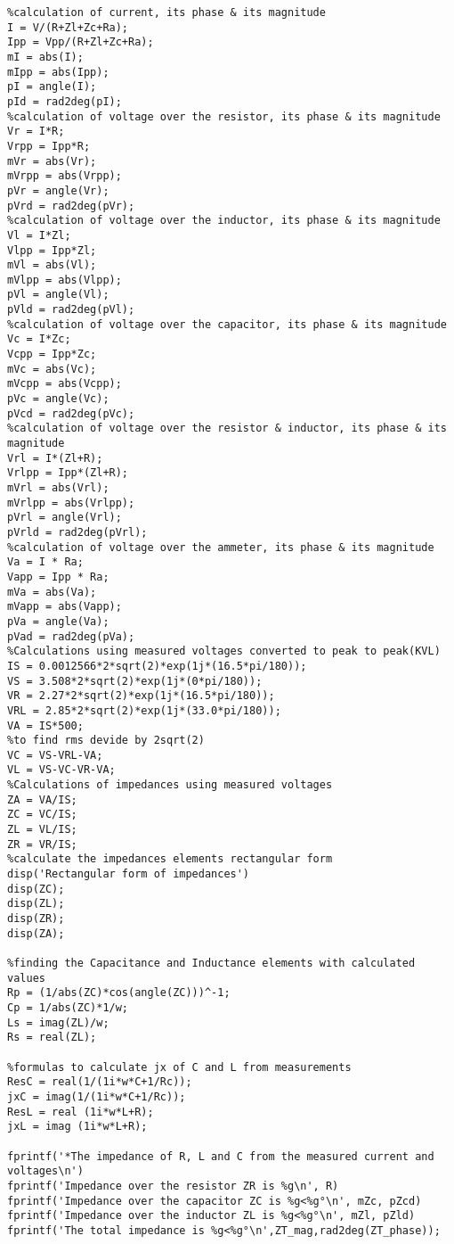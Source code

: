 \documentclass[12pt]{report}
\begin{document}
\begin{verbatim}
%calculation of current, its phase & its magnitude
I = V/(R+Zl+Zc+Ra);              
Ipp = Vpp/(R+Zl+Zc+Ra);
mI = abs(I);
mIpp = abs(Ipp);
pI = angle(I);
pId = rad2deg(pI);
%calculation of voltage over the resistor, its phase & its magnitude
Vr = I*R;             
Vrpp = Ipp*R;
mVr = abs(Vr);
mVrpp = abs(Vrpp);
pVr = angle(Vr);
pVrd = rad2deg(pVr);
%calculation of voltage over the inductor, its phase & its magnitude
Vl = I*Zl;     
Vlpp = Ipp*Zl;
mVl = abs(Vl);
mVlpp = abs(Vlpp);
pVl = angle(Vl);
pVld = rad2deg(pVl);
%calculation of voltage over the capacitor, its phase & its magnitude
Vc = I*Zc;
Vcpp = Ipp*Zc;
mVc = abs(Vc);
mVcpp = abs(Vcpp);
pVc = angle(Vc);
pVcd = rad2deg(pVc);
%calculation of voltage over the resistor & inductor, its phase & its magnitude
Vrl = I*(Zl+R);
Vrlpp = Ipp*(Zl+R);
mVrl = abs(Vrl);
mVrlpp = abs(Vrlpp);
pVrl = angle(Vrl);
pVrld = rad2deg(pVrl);
%calculation of voltage over the ammeter, its phase & its magnitude
Va = I * Ra;
Vapp = Ipp * Ra;
mVa = abs(Va);
mVapp = abs(Vapp);
pVa = angle(Va);
pVad = rad2deg(pVa);
%Calculations using measured voltages converted to peak to peak(KVL)
IS = 0.0012566*2*sqrt(2)*exp(1j*(16.5*pi/180));
VS = 3.508*2*sqrt(2)*exp(1j*(0*pi/180));
VR = 2.27*2*sqrt(2)*exp(1j*(16.5*pi/180));
VRL = 2.85*2*sqrt(2)*exp(1j*(33.0*pi/180));
VA = IS*500;
%to find rms devide by 2sqrt(2)
VC = VS-VRL-VA;
VL = VS-VC-VR-VA;
%Calculations of impedances using measured voltages
ZA = VA/IS;
ZC = VC/IS;
ZL = VL/IS;
ZR = VR/IS;
%calculate the impedances elements rectangular form 
disp('Rectangular form of impedances')
disp(ZC);
disp(ZL);
disp(ZR);
disp(ZA);

%finding the Capacitance and Inductance elements with calculated values
Rp = (1/abs(ZC)*cos(angle(ZC)))^-1;
Cp = 1/abs(ZC)*1/w;
Ls = imag(ZL)/w;
Rs = real(ZL);

%formulas to calculate jx of C and L from measurements
ResC = real(1/(1i*w*C+1/Rc));
jxC = imag(1/(1i*w*C+1/Rc));
ResL = real (1i*w*L+R);
jxL = imag (1i*w*L+R);

fprintf('*The impedance of R, L and C from the measured current and voltages\n')
fprintf('Impedance over the resistor ZR is %g\n', R)
fprintf('Impedance over the capacitor ZC is %g<%g°\n', mZc, pZcd)
fprintf('Impedance over the inductor ZL is %g<%g°\n', mZl, pZld)
fprintf('The total impedance is %g<%g°\n',ZT_mag,rad2deg(ZT_phase)); 


\end{verbatim}
\end{document}
